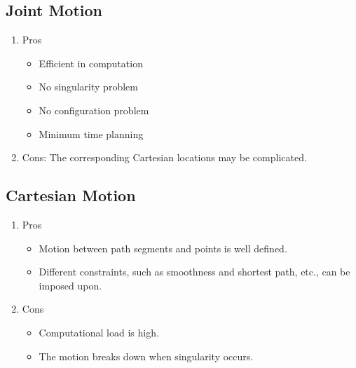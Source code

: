 \documentclass[12pt]{article}
\begin{document}
\subsection{Joint Motion}
\begin{enumerate}
  \item Pros
  \begin{itemize}
    \item Efficient in computation
    \item No singularity problem
    \item No configuration problem
    \item Minimum time planning
  \end{itemize}
  \item Cons: The corresponding Cartesian locations may be complicated.
\end{enumerate}
\subsection{Cartesian Motion}
\begin{enumerate}
  \item Pros
  \begin{itemize}
    \item Motion between path segments and points is well defined.
    \item Different constraints, such as smoothness and shortest path, etc., can be imposed upon.
  \end{itemize}
  \item Cons
  \begin{itemize}
    \item Computational load is high.
    \item The motion breaks down when singularity occurs.
  \end{itemize}
\end{enumerate}
\end{document}
